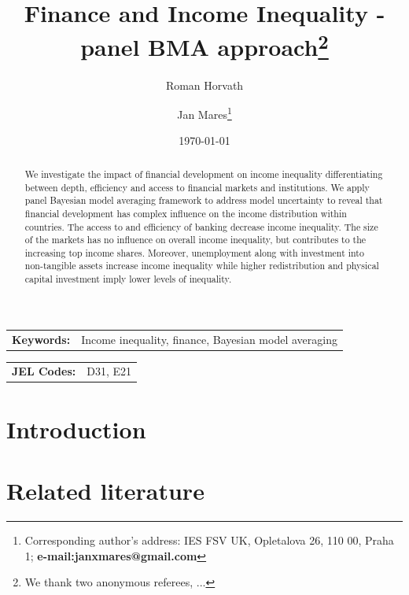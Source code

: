 \documentclass[a4paper,11pt]{article}
\title{Finance and Income Inequality - panel BMA approach\thanks{We thank two anonymous referees, ...}}
\author[a]{Roman Horvath}
\author[a]{Jan Mares\footnote{\footnotesize Corresponding author's address: IES FSV UK, Opletalova 26, 110 00, Praha 1; \textbf{e-mail:janxmares@gmail.com}}}
\affil[a]{Charles University, Prague}
\date{\today}
\begin{document}
\def\sym#1{\ifmmode^{#1}\else\(^{#1}\)\fi} %

\maketitle

\thispagestyle{empty}
\begin{abstract}
    We investigate the impact of financial development on income inequality differentiating between depth, efficiency and access to financial markets and institutions. We apply panel Bayesian model averaging framework to address model uncertainty to reveal that financial development has complex influence on the income distribution within countries. The access to and efficiency of banking decrease income inequality. The size of the markets has no influence on overall income inequality, but contributes to the increasing top income shares. Moreover, unemployment along with investment into non-tangible assets increase income inequality while higher redistribution and physical capital investment imply lower levels of inequality.
\end{abstract}

\bigskip

\begin{tabular}{p{0.25\hsize}p{0.6\hsize}} %
\textbf{Keywords:} & Income inequality, finance, Bayesian model averaging
\end{tabular}

\bigskip

\begin{tabular}{p{0.25\hsize}p{0.6\hsize}}
\textbf{JEL Codes:} & D31, E21\\
\end{tabular}

\clearpage
\setcounter{page}{1}

\section{Introduction}

\section{Related literature}
\end{document}
